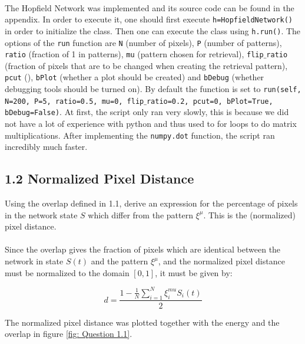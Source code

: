 \paragraph*{}

The Hopfield Network was implemented and its source code can be found in the appendix.  In order to execute it, one should first execute \texttt{h=HopfieldNetwork()} in order  to initialize the class. Then one can execute the class using \texttt{h.run()}. The  options of the \texttt{run} function are \texttt{N} (number of pixels), \texttt{P}  (number of patterns), \texttt{ratio} (fraction of 1 in patterns), \texttt{mu} (pattern  chosen for retrieval), \texttt{flip$\_$ratio} (fraction of pixels that are to be  changed when creating the retrieval pattern), \texttt{pcut} (), \texttt{bPlot} (whether  a plot should be created) and \texttt{bDebug} (whether debugging tools should be turned  on).
By default the function is set to \texttt{run(self, N=200, P=5, ratio=0.5, mu=0,  flip$\_$ratio=0.2, pcut=0, bPlot=True, bDebug=False)}. 
At first, the script only ran very slowly, this is because we did not have a lot of  experience with python and thus used to for loops to do matrix multiplications. After  implementing the \texttt{numpy.dot} function, the script ran incredibly much faster. 

\subsection{1.2 Normalized Pixel Distance}
\begin{itshape}
\small
Using the overlap defined in 1.1, derive an expression for the percentage of pixels in the network state $S$ which differ from the pattern $\xi^\mu$. This is the (normalized) pixel distance.
\end{itshape}

\paragraph*{}

Since the overlap gives the fraction of pixels which are identical between the network in state $S(t)$ and the pattern $\xi^\mu$, and the normalized pixel distance must be normalized to the domain $[0,1]$, it must be given by:

\begin{equation}
d=\frac{1- \frac{1}{N} \sum_{i=1}^N \xi_i^{mu} S_i(t)}{2}
\end{equation}

The normalized pixel distance was plotted together with the energy and the overlap in figure \ref{fig: Question 1.1}.


